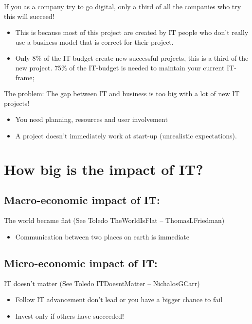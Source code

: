 \documentclass{article}
\begin{document}
If you as a company try to go digital, only a third of all the companies who try this will succeed!

\begin{itemize}
\item  This is because most of this project are created by IT people who don't really use a business model that is correct for their project.

\item  Only 8\% of the IT budget create new successful projects, this is a third of the new project. 75\% of the IT-budget is needed to maintain your current IT-frame;
\end{itemize}

The problem: The gap between IT and business is too big with a lot of new IT projects!

\begin{itemize}
\item  You need planning, resources and user involvement

\item  A project doesn't immediately work at start-up (unrealistic expectations).
\end{itemize}

\section{How big is the impact of IT?}

\subsection{Macro-economic impact of IT:}

The world became flat (See Toledo TheWorldIsFlat -- ThomasLFriedman)

\begin{itemize}
\item  Communication between two places on earth is immediate
\end{itemize}

\subsection{Micro-economic impact of IT:}

IT doesn't matter (See Toledo ITDoesntMatter -- NichalosGCarr)

\begin{itemize}
\item  Follow IT advancement don't lead or you have a bigger chance to fail

\item  Invest only if others have succeeded!
\end{itemize}
\end{document}
